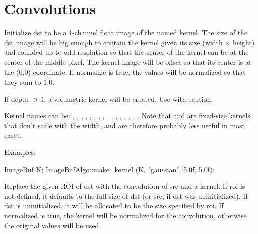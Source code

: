 \section{Convolutions}
\label{sec:iba:convolutions}

 
Initialize {\cf dst} to be a 1-channel {\cf float} image of the named kernel.
The size of the {\cf dst} image will be big enough to contain the kernel
given its size ({\cf width} $\times$ {\cf height})
and rounded up to odd resolution so
that the center of the kernel can be at the center of the middle
pixel.  The kernel image will be offset so that its center is at the
{\cf (0,0)} coordinate.  If {\cf normalize} is true, the values will be
normalized so that they sum to $1.0$.

If {\cf depth} $> 1$, a volumetric kernel will be created.  Use with
caution!

Kernel names can be: , , ,
, , , ,
, , , , ,
, , , . Note that
 and  are fixed-size kernels that don't
scale with the width, and are therefore probably less useful in most
cases.

\smallskip
\noindent Examples:
\begin{code}
    ImageBuf K;
    ImageBufAlgo::make_kernel (K, "gaussian", 5.0f, 5.0f);
\end{code}
\apiend

 
Replace the given ROI of {\cf dst} with the convolution of {\cf src} and
a kernel.  If {\cf roi} is not defined, it defaults to the full size
of {\cf dst} (or {\cf src}, if {\cf dst} was uninitialized).
If {\cf dst} is uninitialized,
it will be allocated to be the size specified by {\cf roi}.  If 
{\cf normalized} is {\cf true}, the kernel will be normalized for the 
convolution, otherwise the original values will be used.

